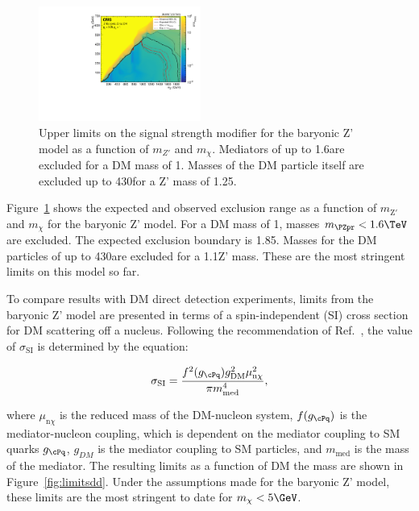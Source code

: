 \begin{figure}[htbp]
  \centering
  \includegraphics[width=0.475\textwidth]{figures/limits/limit2d_zpb_monohbb_.pdf}
  \caption{Upper limits on the signal strength modifier for the baryonic Z' model  as a function of $m_{Z'}$ and $m_\chi$. Mediators of up to 1.6\TeV are excluded for a DM mass of 1\GeV. Masses of the DM particle itself are excluded up to 430\GeV for a Z' mass of 1.25\TeV.}
  \label{fig:limits}
\end{figure}




Figure~\ref{fig:limits} shows the expected and observed exclusion range as a function of $m_{\text{Z}'}$ and $m_{\chi}$ for the baryonic Z' model. For a DM mass of 1\GeV, masses $\mzp<1.6\TeV$ are excluded. The expected exclusion boundary is 1.85\TeV. Masses for the DM particles of up to 430\GeV are excluded for a 1.1\TeV Z' mass. These are the most stringent limits on this model so far. %

To compare results with DM direct detection experiments, limits from the baryonic Z' model are presented in terms of a spin-independent (SI) cross section \SigSI for DM scattering off a nucleus.
Following the recommendation of Ref.~\cite{presentDM}, the value of $\sigma_\text{SI}$ is determined by the equation:

\begin{equation}
\sigma_\text{SI} = \frac{f^2(g_{\cPq})g^2_{\mathrm{DM}}\mu^2_{\mathrm{n}\chi}}{\pi m^4_{\mathrm{med}}},
\end{equation}

where $\mu_{\mathrm{n}\chi}$ is the reduced mass of the DM-nucleon system, $f(g_{\cPq})$ is the mediator-nucleon coupling, which is dependent on the mediator coupling to SM quarks $g_{\cPq}$, $g_{DM}$ is the mediator coupling to SM particles, and $m_{\text{med}}$ is the mass of the mediator.
The resulting \SigSI limits as a function of DM the mass are shown in Figure~\ref{fig:limitsdd}.
Under the assumptions made for the baryonic Z' model, these limits are the most stringent to date for $m_\chi < 5\GeV$.


